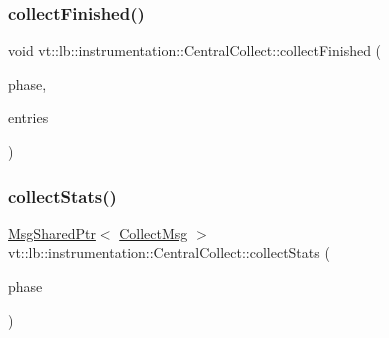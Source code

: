 \subsubsection{\texorpdfstring{collect\+Finished()}{collectFinished()}}
{\footnotesize\ttfamily void vt\+::lb\+::instrumentation\+::\+Central\+Collect\+::collect\+Finished (\begin{DoxyParamCaption}\item[{\hyperlink{namespacevt_a5505d0bab25ce2ff566a8e015871b379}{L\+B\+Phase\+Type} const \&}]{phase,  }\item[{\hyperlink{namespacevt_1_1lb_af7c6ee21a7b3966b7ab64c5b626d30f8}{Proc\+Container\+Type} const \&}]{entries }\end{DoxyParamCaption})\hspace{0.3cm}{\ttfamily [static]}}

\mbox{\label{structvt_1_1lb_1_1instrumentation_1_1_central_collect_a7161d3f662ad33336ff3dfacfb141e45}} 
\subsubsection{\texorpdfstring{collect\+Stats()}{collectStats()}}
{\footnotesize\ttfamily \hyperlink{namespacevt_ab2b3d506ec8e8d1540aede826d84a239}{Msg\+Shared\+Ptr}$<$ \hyperlink{structvt_1_1lb_1_1instrumentation_1_1_collect_msg}{Collect\+Msg} $>$ vt\+::lb\+::instrumentation\+::\+Central\+Collect\+::collect\+Stats (\begin{DoxyParamCaption}\item[{\hyperlink{namespacevt_a5505d0bab25ce2ff566a8e015871b379}{L\+B\+Phase\+Type} const \&}]{phase }\end{DoxyParamCaption})\hspace{0.3cm}{\ttfamily [static]}}

\mbox{\label{structvt_1_1lb_1_1instrumentation_1_1_central_collect_a38b6e55982754362cbea1921e044038c}} 
